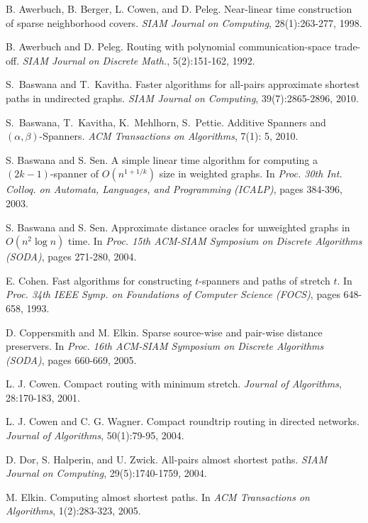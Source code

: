 \documentclass[a4paper,11pt]{article}
\theoremstyle{definition}
\begin{document}
\begin{thebibliography}{20}


B. Awerbuch, B. Berger, L. Cowen, and D. Peleg.
Near-linear time construction of sparse neighborhood covers.
{\em SIAM Journal on Computing}, 28(1):263-277, 1998.

B. Awerbuch and D. Peleg.
Routing with polynomial communication-space trade-off.
{\em SIAM Journal on Discrete Math.}, 5(2):151-162, 1992.

S.~Baswana and T.~Kavitha.
Faster algorithms for all-pairs approximate shortest paths in undirected graphs.
{\em SIAM Journal on Computing}, 39(7):2865-2896, 2010.

S.~Baswana, T.~Kavitha, K.~Mehlhorn, S.~Pettie.
Additive Spanners and $(\alpha,\beta)$-Spanners.
{\em ACM Transactions on Algorithms}, 7(1): 5, 2010.

S. Baswana and S. Sen.
A simple linear time algorithm for computing a $(2k-1)$-spanner of $O(n^{1+1/k})$ size in weighted graphs.
In {\em Proc. 30th Int. Colloq. on Automata, Languages, and Programming (ICALP)}, pages 384-396, 2003.

S. Baswana and S. Sen.
Approximate distance oracles for unweighted graphs in $O(n^2\log n)$ time.
In {\em Proc. 15th ACM-SIAM Symposium on Discrete Algorithms (SODA)}, pages 271-280, 2004.


E. Cohen.
Fast algorithms for constructing $t$-spanners and paths of stretch $t$.
In {\em Proc. 34th IEEE Symp. on Foundations of Computer Science (FOCS)},  pages 648-658, 1993.

D. Coppersmith and M. Elkin.
Sparse source-wise and pair-wise distance preservers.
In {\em Proc. 16th ACM-SIAM Symposium on Discrete Algorithms (SODA)}, pages 660-669, 2005.

L. J. Cowen.
Compact routing with minimum stretch.
{\em Journal of Algorithms}, 28:170-183, 2001.

L. J. Cowen and C. G. Wagner.
Compact roundtrip routing in directed networks.
{\em Journal of Algorithms}, 50(1):79-95, 2004.

D. Dor, S. Halperin, and U. Zwick.
All-pairs almost shortest paths.
{\em SIAM Journal on Computing}, 29(5):1740-1759, 2004.

M. Elkin.
Computing almost shortest paths.
In {\em ACM Transactions on Algorithms}, 1(2):283-323, 2005.


\end{thebibliography}
\end{document}
